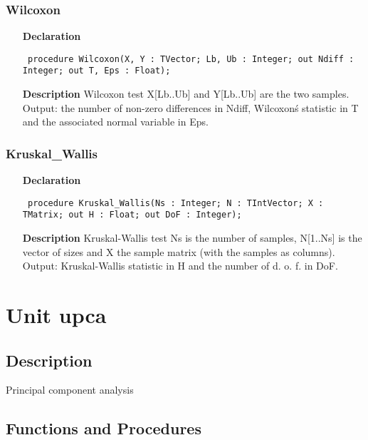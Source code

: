 \documentclass[12pt,a4paper,oneside]{report}
\newcommand{\declarationitem}[1]{\textbf{#1}}
\newcommand{\descriptiontitle}[1]{\textbf{#1}}
\newcommand{\code}[1]{\texttt{#1}}
\begin{document}
\subsubsection{Wilcoxon}
\label{unonpar-Wilcoxon}
\begin{itemize}\item[\declarationitem{Declaration}\hfill]
	\begin{flushleft}
		\code{
			procedure Wilcoxon(X, Y : TVector; Lb, Ub : Integer; out Ndiff : Integer; out T, Eps : Float);}
	\end{flushleft}
	\item[\descriptiontitle{Description}]
	Wilcoxon test X[Lb..Ub] and Y[Lb..Ub] are the two samples. Output: the number of non{-}zero differences in Ndiff, Wilcoxon\'s statistic in T 
	and the associated normal variable in Eps.
\end{itemize}
\subsubsection{Kruskal{\_}Wallis}
\label{unonpar-Kruskal_Wallis}
\begin{itemize}\item[\declarationitem{Declaration}\hfill]
	\begin{flushleft}
		\code{
			procedure Kruskal{\_}Wallis(Ns : Integer; N : TIntVector; X : TMatrix; out H : Float; out DoF : Integer);}
	\end{flushleft}
	\item[\descriptiontitle{Description}]
	Kruskal{-}Wallis test Ns is the number of samples, N[1..Ns] is the vector of sizes and X the sample matrix (with the samples as columns). Output: Kruskal{-}Wallis statistic in H and the number of d. o. f. in DoF.
\end{itemize}


\section{Unit upca}
\label{upca}
\subsection{Description}
Principal component analysis 
\subsection{Functions and Procedures}
\end{document}
